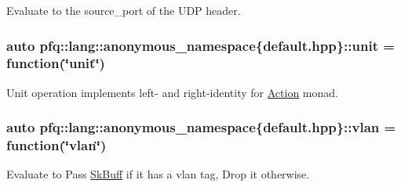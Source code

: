 Evaluate to the {\ttfamily source\+\_\+port} of the U\+DP header. 

\subsubsection[{\texorpdfstring{unit}{unit}}]{\setlength{\rightskip}{0pt plus 5cm}auto pfq\+::lang\+::anonymous\+\_\+namespace\{default.\+hpp\}\+::unit = {\bf function}(\char`\"{}unit\char`\"{})}\hypertarget{namespacepfq_1_1lang_1_1anonymous__namespace_02default_8hpp_03_a85f9b2d401cbb1d135679160de0e97de}{}\label{namespacepfq_1_1lang_1_1anonymous__namespace_02default_8hpp_03_a85f9b2d401cbb1d135679160de0e97de}


Unit operation implements left-\/ and right-\/identity for \hyperlink{structpfq_1_1lang_1_1Action}{Action} monad. 

\subsubsection[{\texorpdfstring{vlan}{vlan}}]{\setlength{\rightskip}{0pt plus 5cm}auto pfq\+::lang\+::anonymous\+\_\+namespace\{default.\+hpp\}\+::vlan = {\bf function}(\char`\"{}vlan\char`\"{})}\hypertarget{namespacepfq_1_1lang_1_1anonymous__namespace_02default_8hpp_03_a747e907a678ad69c5bfdd3048a239b6a}{}\label{namespacepfq_1_1lang_1_1anonymous__namespace_02default_8hpp_03_a747e907a678ad69c5bfdd3048a239b6a}


Evaluate to {\ttfamily Pass} \hyperlink{structpfq_1_1lang_1_1SkBuff}{Sk\+Buff} if it has a vlan tag, {\ttfamily Drop} it otherwise. 

